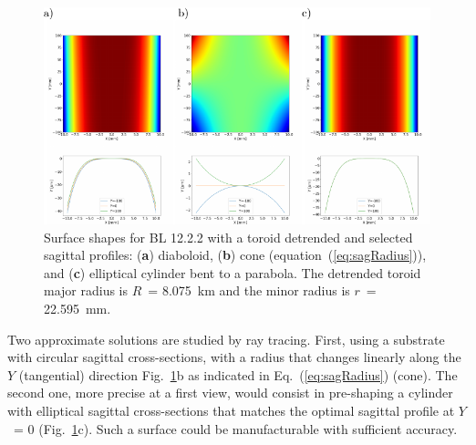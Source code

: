 \documentclass{iucr}       %
\begin{document}
\begin{figure}\label{fig:detrendedBeamline}
\includegraphics[width=1.0\textwidth]{figures/fig8.pdf}
% 

\caption{Surface shapes for BL 12.2.2 with a toroid detrended and selected sagittal profiles: (\textbf{a}) diaboloid, (\textbf{b}) cone (equation~(\ref{eq:sagRadius})), and (\textbf{c}) elliptical cylinder bent to a parabola. The detrended toroid major radius is $R$~= \SI{8.075}{\kilo\meter} and the minor radius is $r$~= \SI{22.595}{\milli\meter}.}
\end{figure}

Two approximate solutions are studied by ray tracing. First, using a substrate with circular sagittal cross-sections, with a radius that changes linearly along the $Y$ (tangential) direction Fig.~\ref{fig:detrendedBeamline}b as indicated in Eq.~(\ref{eq:sagRadius}) (cone). The second one, more precise at a first view, would consist in pre-shaping a cylinder with elliptical sagittal cross-sections that matches the optimal sagittal profile at $Y$~= 0 (Fig.~\ref{fig:detrendedBeamline}c). Such a surface could be manufacturable with sufficient accuracy.
\end{document}
